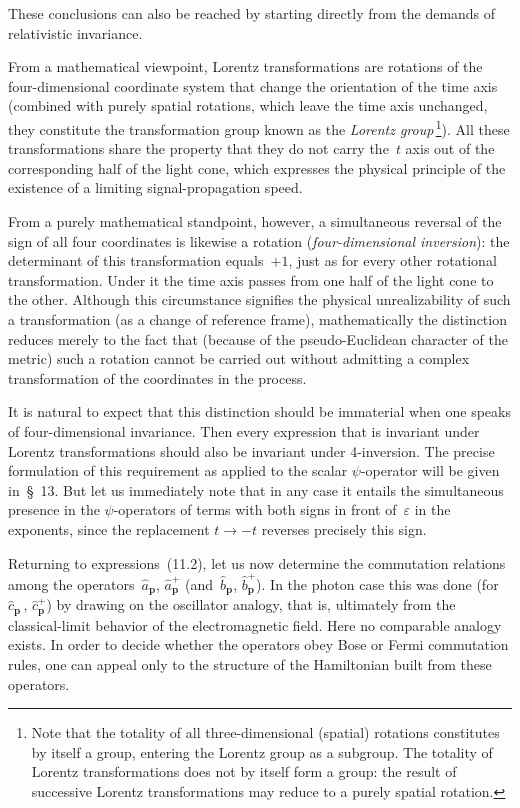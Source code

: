 These conclusions can also be reached by starting directly from the demands of relativistic invariance.

From a mathematical viewpoint, Lorentz transformations are rotations of the four-dimensional coordinate system that change the orientation of the time axis (combined with purely spatial rotations, which leave the time axis unchanged, they constitute the transformation group known as the \emph{Lorentz group}\,\footnote{Note that the totality of all three-dimensional (spatial) rotations constitutes by itself a group, entering the Lorentz group as a subgroup. The totality of Lorentz transformations does not by itself form a group: the result of successive Lorentz transformations may reduce to a purely spatial rotation.}). All these transformations share the property that they do not carry the~$t$ axis out of the corresponding half of the light cone, which expresses the physical principle of the existence of a limiting signal-propagation speed.

From a purely mathematical standpoint, however, a simultaneous reversal of the sign of all four coordinates is likewise a rotation (\emph{four-dimensional inversion}): the determinant of this transformation equals~$+1$, just as for every other rotational transformation. Under it the time axis passes from one half of the light cone to the other. Although this circumstance signifies the physical unrealizability of such a transformation (as a change of reference frame), mathematically the distinction reduces merely to the fact that (because of the pseudo-Euclidean character of the metric) such a rotation cannot be carried out without admitting a complex transformation of the coordinates in the process.

It is natural to expect that this distinction should be immaterial when one speaks of four-dimensional invariance. Then every expression that is invariant under Lorentz transformations should also be invariant under 4-inversion. The precise formulation of this requirement as applied to the scalar $\psi$-operator will be given in~\S~13. But let us immediately note that in any case it entails the simultaneous presence in the $\psi$-operators of terms with both signs in front of~$\varepsilon$ in the exponents, since the replacement $t \to -t$ reverses precisely this sign.

Returning to expressions~(11.2), let us now determine the commutation relations among the operators~$\hat{a}_\mathbf{p}$, $\hat{a}^+_\mathbf{p}$ (and~$\hat{b}_\mathbf{p}$, $\hat{b}^+_\mathbf{p}$). In the photon case this was done (for~$\hat{c}_\mathbf{p}$\,, $\hat{c}^+_\mathbf{p}$) by drawing on the oscillator analogy, that is, ultimately from the classical-limit behavior of the electromagnetic field. Here no comparable analogy exists. In order to decide whether the operators obey Bose or Fermi commutation rules, one can appeal only to the structure of the Hamiltonian built from these operators.

